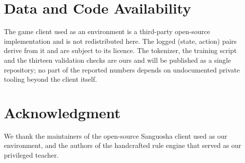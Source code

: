 \documentclass[11pt]{article}
\begin{document}
\section*{Data and Code Availability}

The game client used as an environment is a third-party open-source implementation and is not
redistributed here. The logged (state, action) pairs derive from it and are subject to its
licence. The tokenizer, the training script and the thirteen validation checks are ours and
will be published as a single repository; no part of the reported numbers depends on
undocumented private tooling beyond the client itself.

\section*{Acknowledgment}

We thank the maintainers of the open-source Sanguosha client used as our environment, and
the authors of the handcrafted rule engine that served as our privileged teacher.
\end{document}
